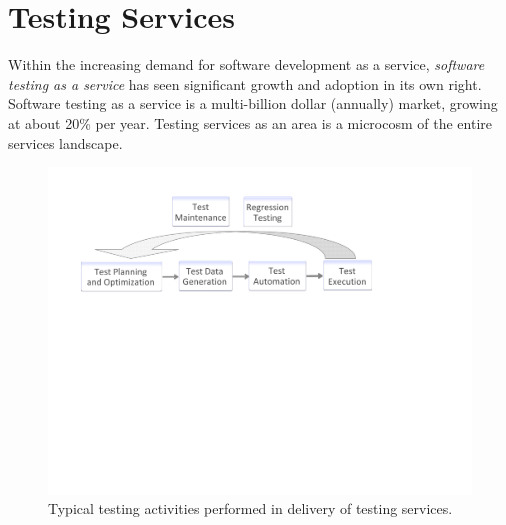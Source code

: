 
\section{Testing Services}
\label{sec:testing-debugging}

Within the increasing demand for software development as a service,
\textit{software testing as a service} has seen significant growth and adoption
in its own right.  Software testing as a service is a multi-billion dollar (annually) 
market, growing at about 20\% per year. Testing services as an area is a microcosm
of the entire services landscape.



\begin{figure}[t]
\centering
\includegraphics[width=.9\columnwidth, clip, trim = 22mm 133mm 65mm
  17mm]{figs/testing-activities.pdf}
\vspace*{-8pt}
\caption{Typical testing activities performed in delivery of testing services.}
\vspace*{-15pt}
\label{fig:testing-activities}
\end{figure}

